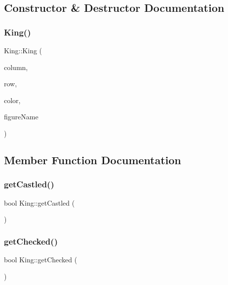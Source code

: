 \subsection{Constructor \& Destructor Documentation}
\mbox{\label{class_king_aed2be62051387868f78919da2d1970c9}} 
\subsubsection{\texorpdfstring{King()}{King()}}
{\footnotesize\ttfamily King\+::\+King (\begin{DoxyParamCaption}\item[{int}]{column,  }\item[{int}]{row,  }\item[{\hyperlink{_piece_8h_ad7595c48bb74c0dd2a7648712a2d4985}{Piece\+Color}}]{color,  }\item[{std\+::string}]{figure\+Name }\end{DoxyParamCaption})\hspace{0.3cm}{\ttfamily [inline]}}



\subsection{Member Function Documentation}
\mbox{\label{class_king_a7f58cb2d7d005f03d229af195136b00a}} 
\subsubsection{\texorpdfstring{get\+Castled()}{getCastled()}}
{\footnotesize\ttfamily bool King\+::get\+Castled (\begin{DoxyParamCaption}{ }\end{DoxyParamCaption})}

\mbox{\label{class_king_aecc7387c9b2d6e94b556d416b985b210}} 
\subsubsection{\texorpdfstring{get\+Checked()}{getChecked()}}
{\footnotesize\ttfamily bool King\+::get\+Checked (\begin{DoxyParamCaption}{ }\end{DoxyParamCaption})}

